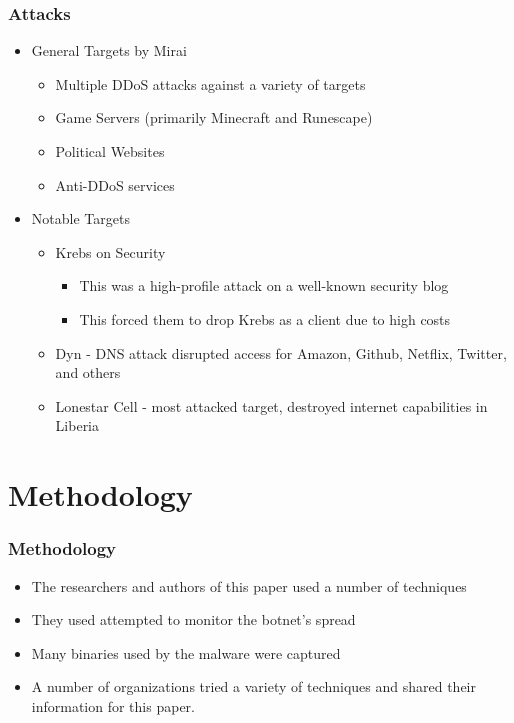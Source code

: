 \documentclass{beamer}
\begin{document}
\begin{frame}
    \frametitle{Attacks}
	\begin{itemize}
		\item General Targets by Mirai
			\begin{itemize}
				\item Multiple DDoS attacks against a variety of targets
				\item Game Servers (primarily Minecraft and Runescape)
				\item Political Websites
				\item Anti-DDoS services
			\end{itemize}
		\item Notable Targets
			\begin{itemize}
				\item Krebs on Security
				\begin{itemize}
					\item This was a high-profile attack on a well-known security blog
					\item This forced them to drop Krebs as a client due to high costs
				\end{itemize}
				\item Dyn - DNS attack disrupted access for Amazon, Github, Netflix, Twitter, and others
				\item Lonestar Cell - most attacked target, destroyed internet capabilities in Liberia
			\end{itemize}
	\end{itemize}
\end{frame}

\section{Methodology}

\begin{frame}
	\frametitle{Methodology}
	\begin{itemize}
		\item The researchers and authors of this paper used a number of techniques
		\item They used attempted to monitor the botnet's spread
		\item Many binaries used by the malware were captured
		\item A number of organizations tried a variety of techniques and shared their information for this paper.
	\end{itemize}
\end{frame}
\end{document}
